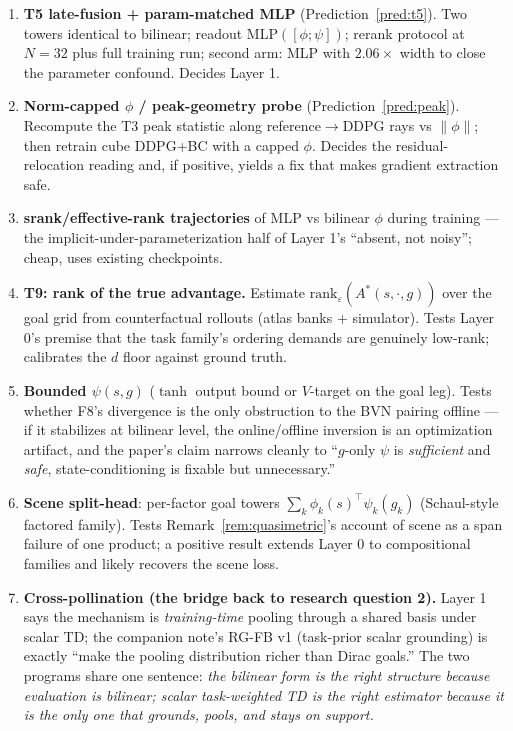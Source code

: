 \documentclass[11pt]{article}
\theoremstyle{definition}
\theoremstyle{remark}
\begin{document}
\begin{enumerate}[leftmargin=1.7em,itemsep=3pt]
\item \textbf{T5 late-fusion + param-matched MLP} (Prediction~\ref{pred:t5}). Two towers
identical to bilinear; readout MLP$([\phi;\psi])$; rerank protocol at $N{=}32$ plus full
training run; second arm: MLP with $2.06\times$ width to close the parameter confound.
Decides Layer 1.
\item \textbf{Norm-capped $\phi$ / peak-geometry probe} (Prediction~\ref{pred:peak}).
Recompute the T3 peak statistic along reference$\to$DDPG rays vs $\|\phi\|$; then retrain
cube DDPG+BC with a capped $\phi$. Decides the residual-relocation reading and, if
positive, yields a fix that makes gradient extraction safe.
\item \textbf{srank/effective-rank trajectories} of MLP vs bilinear $\phi$ during training
--- the implicit-under-parameterization half of Layer 1's ``absent, not noisy''; cheap, uses
existing checkpoints.
\item \textbf{T9: rank of the true advantage.} Estimate
$\mathrm{rank}_\varepsilon(A^*(s,\cdot,g))$ over the goal grid from counterfactual rollouts
(atlas banks + simulator). Tests Layer 0's premise that the task family's ordering demands
are genuinely low-rank; calibrates the $d$ floor against ground truth.
\item \textbf{Bounded $\psi(s,g)$} ($\tanh$ output bound or $V$-target on the goal leg).
Tests whether F8's divergence is the only obstruction to the BVN pairing offline --- if it
stabilizes at bilinear level, the online/offline inversion is an optimization artifact, and
the paper's claim narrows cleanly to ``$g$-only $\psi$ is \emph{sufficient} and \emph{safe},
state-conditioning is fixable but unnecessary.''
\item \textbf{Scene split-head}: per-factor goal towers $\sum_k\phi_k(s)^\top\psi_k(g_k)$
(Schaul-style factored family). Tests Remark~\ref{rem:quasimetric}'s account of scene as a
span failure of one product; a positive result extends Layer 0 to compositional families and
likely recovers the scene loss.
\item \textbf{Cross-pollination (the bridge back to research question 2).} Layer 1 says the
mechanism is \emph{training-time} pooling through a shared basis under scalar TD; the
companion note's RG-FB v1 (task-prior scalar grounding) is exactly ``make the pooling
distribution richer than Dirac goals.'' The two programs share one sentence: \emph{the
bilinear form is the right structure because evaluation is bilinear; scalar task-weighted TD
is the right estimator because it is the only one that grounds, pools, and stays on
support.}
\end{enumerate}
\end{document}
